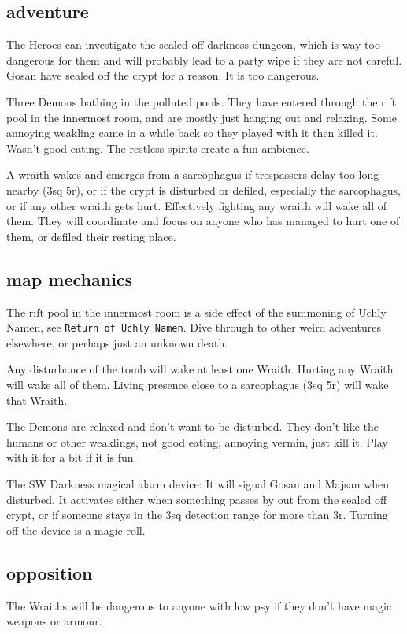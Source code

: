 \subsection*{adventure}
The Heroes can investigate the sealed off darkness dungeon, which is way too dangerous for them and will probably lead to a party wipe if they are not careful. Gosan have sealed off the crypt for a reason. It is too dangerous.

Three Demons bathing in the polluted pools. They have entered through the rift pool in the innermost room, and are mostly just hanging out and relaxing. Some annoying weakling came in a while back so they played with it then killed it. Wasn't good eating. The restless spirits create a fun ambience.

A wraith wakes and emerges from a sarcophagus if trespassers delay too long nearby (3sq 5r), or if the crypt is disturbed or defiled, especially the sarcophagus, or if any other wraith gets hurt. Effectively fighting any wraith will wake all of them. They will coordinate and focus on anyone who has managed to hurt one of them, or defiled their resting place.


\subsection*{map mechanics}
The rift pool in the innermost room is a side effect of the summoning of Uchly Namen, see \texttt{Return of Uchly Namen}. Dive through to other weird adventures elsewhere, or perhaps just an unknown death.

Any disturbance of the tomb will wake at least one Wraith. Hurting any Wraith will wake all of them. Living presence close to a sarcophagus (3sq 5r) will wake that Wraith.

The Demons are relaxed and don't want to be disturbed. They don't like the humans or other weaklings, not good eating, annoying vermin, just kill it. Play with it for a bit if it is fun.

The SW Darkness magical alarm device: It will signal Gosan and Majsan when disturbed. It activates either when something passes by out from the sealed off crypt, or if someone stays in the 3sq detection range for more than 3r.
Turning off the device is a magic roll.


\subsection*{opposition}
The Wraiths will be dangerous to anyone with low psy if they don't have magic weapons or armour.

